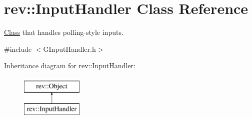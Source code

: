 \hypertarget{classrev_1_1_input_handler}{}\section{rev\+::Input\+Handler Class Reference}
\label{classrev_1_1_input_handler}


\mbox{\hyperlink{struct_class}{Class}} that handles polling-\/style inputs.  




{\ttfamily \#include $<$G\+Input\+Handler.\+h$>$}

Inheritance diagram for rev\+::Input\+Handler\+:\begin{figure}[H]
\begin{center}
\leavevmode
\includegraphics[height=2.000000cm]{classrev_1_1_input_handler}
\end{center}
\end{figure}
